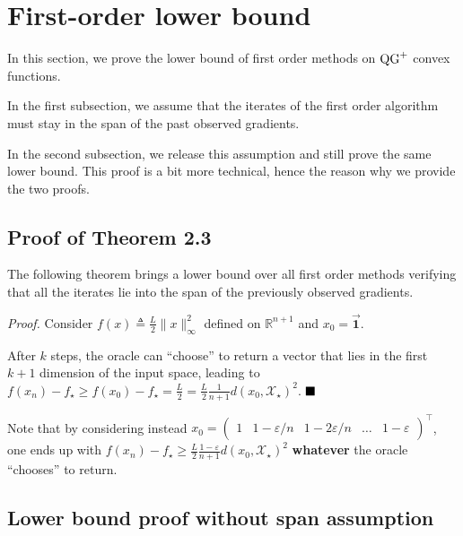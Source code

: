 \section{First-order lower bound}
\label{apx:lower_bound}

In this section, we prove the lower bound of first order methods on $\operatorname{QG}^+$ convex functions.

In the first subsection, we assume that the iterates of the first order algorithm must stay in the span of the past observed gradients.

In the second subsection, we release this assumption and still prove the same lower bound. This proof is a bit more technical, hence the reason why we provide the two proofs.

\subsection{\texorpdfstring{Proof of Theorem 2.3}{Proof of Theorem \ref{thm:general_lower_bound}}}\label{apx:lower_bound_1}

The following theorem brings a lower bound over all first order methods verifying that all the iterates lie into the span of the previously observed gradients.

\lowerboundoffirstorderalgorithm*

\noindent \textit{Proof.}
    Consider $f(x) \triangleq \frac{L}{2}\|x\|_\infty^2$ defined on $\mathbb{R}^{n+1}$ and $x_0=\Vec{\mathbf{1}}$.
    
    After $k$ steps, the oracle can ``choose'' to return a vector that lies in the first $k+1$ dimension of the input space, leading to $f(x_n) - f_\star \geq f(x_0) - f_\star = \frac{L}{2} = \frac{L}{2}\frac{1}{n+1} d(x_0, \mathcal{X}_\star)^2$.
$\hfill\blacksquare$

\begin{Rem}
    Note that by considering instead $x_0 = \begin{pmatrix}
        1 & 1 - \varepsilon/n & 1 - 2\varepsilon/n & \ldots & 1 - \varepsilon
    \end{pmatrix}^\top$,
    one ends up with $f(x_n) - f_\star \geq \frac{L}{2}\frac{1 - \varepsilon}{n+1} d(x_0, \mathcal{X}_\star)^2$ \textbf{whatever} the oracle ``chooses'' to return.
\end{Rem}

\subsection{Lower bound proof without span assumption}\label{apx:lower_bound_2}

